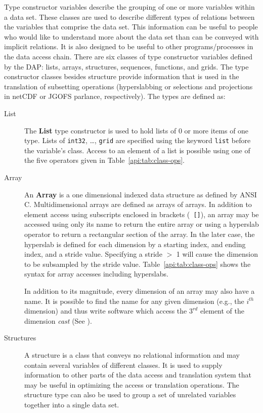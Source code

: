 Type constructor variables describe the grouping of one or more variables
within a data set. These classes are used to describe different types of
relations between the variables that comprise the data set. This information
can be useful to people who would like to understand more about the data set
than can be conveyed with implicit relations. It is also designed to be
useful to other programs/processes in the data access chain.  There are six
classes of type constructor variables defined by the DAP: lists, arrays,
structures, sequences, functions, and grids. The type constructor classes
besides structure provide information that is used in the translation of
subsetting operations (hyperslabbing or selections and projections in netCDF
or JGOFS parlance, respectively). The types are defined as:

\begin{description}

\item [List] The {\bf List} type constructor is used to hold lists of 0 or
  more items of one type. Lists of {\tt int32}, \ldots, {\tt grid} are
  specified using the keyword {\tt list} before the variable's class. Access
  to an element of a list is possible using one of the five operators given
  in Table~\ref{api:tab:class-ops}.

\item [Array] An {\bf Array} is a one dimensional indexed data structure as
  defined by ANSI C\@. Multidimensional arrays are defined as arrays of arrays.
  In addition to element access using subscripts enclosed in brackets ({\tt
    []}), an array may be accessed using only its name to return the entire
  array or using a hyperslab operator to return a rectangular section of the
  array. In the later case, the hyperslab is defined for each dimension by a
  starting index, and ending index, and a stride value.  Specifying a stride
  $>$ 1 will cause the dimension to be subsampled by the stride value.
  Table~\ref{api:tab:class-ops} shows the syntax for array accesses including
  hyperslabs.

  In addition to its magnitude, every dimension of an array may also have a
  name. It is possible to find the name for any given dimension (e.g., the
  $i^{th}$ dimension) and thus write software which access the $3^{rd}$
  element of the dimension {\em cast\/} (See \TOOLKIT).

\item [Structures] A structure is a class that conveys no relational
  information and may contain several variables of different classes. It is
  used to supply information to other parts of the data access and
  translation system that may be useful in optimizing the access or
  translation operations. The structure type can also be used to group a set
  of unrelated variables together into a single data set.


\end{description}
